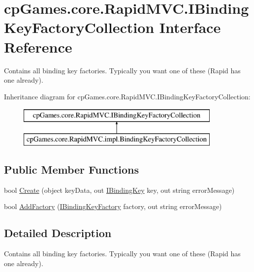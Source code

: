 \hypertarget{interfacecp_games_1_1core_1_1_rapid_m_v_c_1_1_i_binding_key_factory_collection}{}\section{cp\+Games.\+core.\+Rapid\+M\+V\+C.\+I\+Binding\+Key\+Factory\+Collection Interface Reference}
\label{interfacecp_games_1_1core_1_1_rapid_m_v_c_1_1_i_binding_key_factory_collection}


Contains all binding key factories. Typically you want one of these (Rapid has one already).  


Inheritance diagram for cp\+Games.\+core.\+Rapid\+M\+V\+C.\+I\+Binding\+Key\+Factory\+Collection\+:\begin{figure}[H]
\begin{center}
\leavevmode
\includegraphics[height=2.000000cm]{interfacecp_games_1_1core_1_1_rapid_m_v_c_1_1_i_binding_key_factory_collection}
\end{center}
\end{figure}
\subsection*{Public Member Functions}
\begin{DoxyCompactItemize}
\item 
bool \mbox{\hyperlink{interfacecp_games_1_1core_1_1_rapid_m_v_c_1_1_i_binding_key_factory_collection_a0e768b4fdf7855f5b5f9b7ac0c1865c8}{Create}} (object key\+Data, out \mbox{\hyperlink{interfacecp_games_1_1core_1_1_rapid_m_v_c_1_1_i_binding_key}{I\+Binding\+Key}} key, out string error\+Message)
\item 
bool \mbox{\hyperlink{interfacecp_games_1_1core_1_1_rapid_m_v_c_1_1_i_binding_key_factory_collection_aa7aace3ebec361b82a563258ddda2213}{Add\+Factory}} (\mbox{\hyperlink{interfacecp_games_1_1core_1_1_rapid_m_v_c_1_1_i_binding_key_factory}{I\+Binding\+Key\+Factory}} factory, out string error\+Message)
\end{DoxyCompactItemize}


\subsection{Detailed Description}
Contains all binding key factories. Typically you want one of these (Rapid has one already). 



